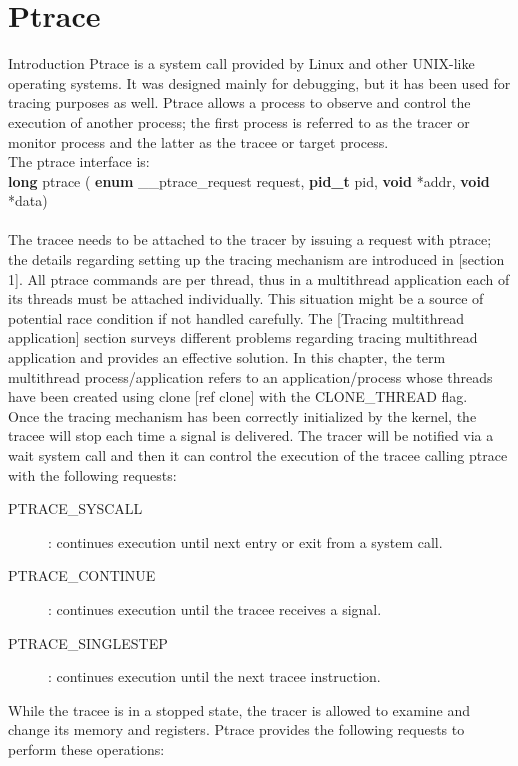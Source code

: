 
\chapter{Ptrace}
Introduction
Ptrace is a system call provided by Linux and other UNIX-like operating systems. It was designed mainly for debugging, but it has been used for tracing purposes as well. Ptrace allows a process to observe and control the execution of another process; the first process is referred to as the tracer or monitor process and the latter as the tracee or target process.  \\
The ptrace interface is: \\ 
	\textbf{long} ptrace ( \textbf{enum} \_\_ptrace\_request request, \textbf{pid\_t} pid, \textbf{void} *addr, \textbf{void} *data)
\\ \\ 
The tracee needs to be attached to the tracer by issuing a request with ptrace; the details regarding setting up the tracing mechanism are introduced in [section 1].  All ptrace commands are per thread, thus in a multithread application each of its threads must be attached individually. This situation might be a source of potential race condition if not handled carefully. The [Tracing multithread application] section surveys different problems regarding tracing multithread application and provides an effective solution. In this chapter, the term multithread process/application refers to an application/process whose threads have been created using clone [ref clone] with the CLONE\_THREAD flag.  \\
Once the tracing mechanism has been correctly initialized by the kernel, the tracee will stop each time a signal is delivered. The tracer will be notified via a wait system call and then it can control the execution of the tracee calling ptrace with the following requests:\\
\begin{description}
\item[PTRACE\_SYSCALL] :
	continues execution until next entry or exit from a system call.
\item[PTRACE\_CONTINUE]:
	 continues execution until the tracee receives a signal.
\item[PTRACE\_SINGLESTEP] :
	continues execution until the next tracee instruction. 
\end{description}

While the tracee is in a stopped state, the tracer is allowed to examine and change its memory and registers. Ptrace provides the following requests to perform these operations: \\

